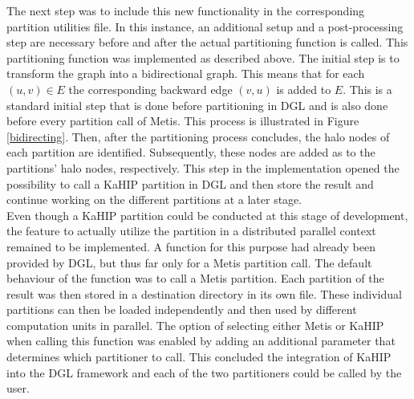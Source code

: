\documentclass[acmsmall,nonacm,screen,review]{acmart}
\begin{document}
The next step was to include this new functionality in the corresponding partition utilities file. In this instance, an additional setup and a post-processing step are necessary before and after the actual partitioning function is called. This partitioning function was implemented as described above. The initial step is to transform the graph into a bidirectional graph. This means that for each $(u,v) \in E$ the corresponding backward edge $(v,u)$ is added to $E$. This is a standard initial step that is done before partitioning in DGL and is also done before every partition call of Metis. This process is illustrated in Figure \ref{bidirecting}. Then, after the partitioning process concludes, the halo nodes of each partition are identified. Subsequently, these nodes are added as to the partitions' halo nodes, respectively. This step in the implementation opened the possibility to call a KaHIP partition in DGL and then store the result and continue working on the different partitions at a later stage. \\
Even though a KaHIP partition could be conducted at this stage of development, the feature to actually utilize the partition in a distributed parallel context remained to be implemented. A function for this purpose had already been provided by DGL, but thus far only for a Metis partition call. The default behaviour of the function was to call a Metis partition. Each partition of the result was then stored in a destination directory in its own file. These individual partitions can then be loaded independently and then used by different computation units in parallel. The option of selecting either Metis or KaHIP when calling this function was enabled by adding an additional parameter that determines which partitioner to call. This concluded the integration of KaHIP into the DGL framework and each of the two partitioners could be called by the user.
\end{document}
